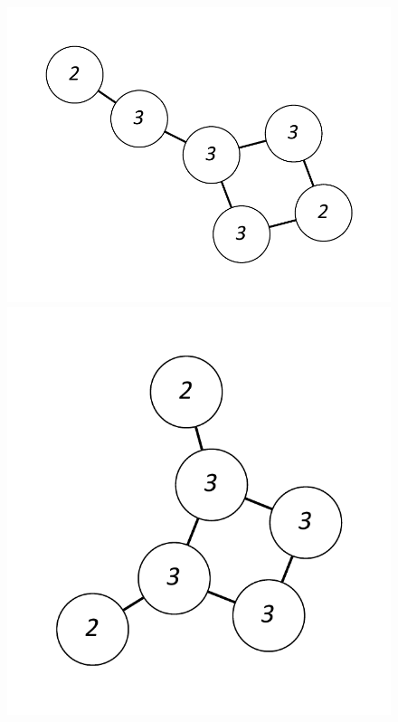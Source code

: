 \documentclass[12pt]{article}
\theoremstyle{plain}
\theoremstyle{definition}
\theoremstyle{remark}
\begin{document}
\begin{figure}[htb]
     	\includegraphics[scale=0.25]{Delta3TriangleFree/001010011011000[3,3,3,2,2,3].pdf}
     	\includegraphics[scale=0.25]{Delta3TriangleFree/001110011001000[3,3,2,2,3,3].pdf}

\end{figure}
\end{document}
